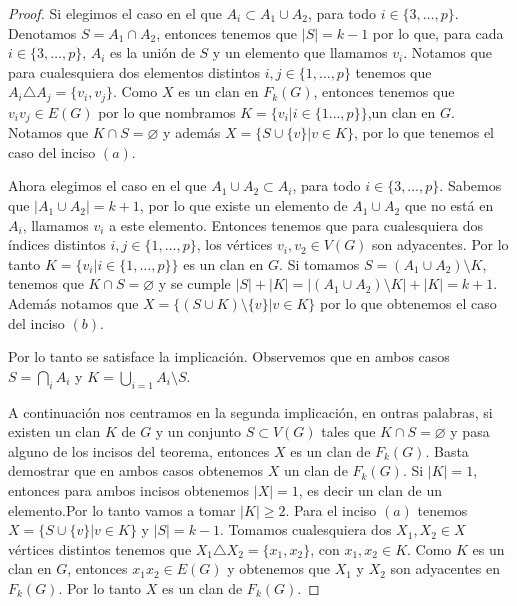 \begin{proof}
        Si elegimos el caso en el que $A_i \subset A_1\cup A_2$, para todo $i\in
        \{3, \dots, p\}$. Denotamos $S= A_1 \cap A_2$, entonces tenemos que $|S|
        =k-1$ por lo que, para cada $i \in \{3, \dots, p\}$, $A_i$ es la uni\'on
        de $S$ y un elemento que llamamos $v_i$. Notamos que para cualesquiera
        dos elementos distintos $i, j \in \{1, \dots, p\}$ tenemos que $A_i
        \triangle A_j = \{v_i, v_j\}$. Como $X$ es un clan en $F_k(G)$, entonces
        tenemos que $v_iv_j \in E(G)$ por lo que nombramos $K= \{v_i|i \in \{1
        \dots, p\}\}$,un clan en $G$. Notamos que  $K \cap S = \varnothing$ y
        adem\'as $X= \{S \cup \{v\}| v \in K\}$, por lo que tenemos el caso del
        inciso $(a)$. 

        Ahora elegimos el caso en el que $A_1\cup A_2 \subset A_i$, para todo
        $i\in \{3, \dots, p\}$. Sabemos que $|A_1 \cup A_2| = k+1$, por lo que
        existe un elemento de $A_1 \cup A_2$ que no est\'a en $A_i$, llamamos
        $v_i$ a este elemento. Entonces tenemos que para cualesquiera dos
        \'indices distintos $i, j \in \{1, \dots, p\}$, los v\'ertices $v_i, v_2
        \in V(G)$ son adyacentes. Por lo tanto $K= \{v_i| i \in \{1, \dots,
        p\}\}$ es un clan en $G$. Si tomamos $S= (A_1 \cup A_2)\setminus K$,
        tenemos que $K \cap S = \varnothing$ y se cumple $|S| + |K|= |(A_1 \cup
        A_2)\setminus K| + |K| = k+1$. Adem\'as notamos que $X = \{(S \cup
        K)\setminus \{v\}|v\in K\}$ por lo que obtenemos el caso del inciso
        $(b)$.

        Por lo tanto se satisface la implicaci\'on. Observemos que en ambos
        casos $S = \bigcap\limits_{i} A_i$ y $K = \bigcup\limits_{i=1} A_i
        \setminus S$.
        
        A continuaci\'on nos centramos en la segunda implicaci\'on, en ontras
        palabras, si existen un clan $K$ de $G$ y un conjunto $S \subset V(G)$
        tales que $K \cap S = \varnothing$ y pasa alguno de los incisos del
        teorema, entonces $X$ es un clan de $F_k(G)$. Basta demostrar que en
        ambos casos obtenemos $X$ un clan de $F_k(G)$. Si $|K| =1$, entonces
        para ambos incisos obtenemos $|X| =1$, es decir un clan de un
        elemento.Por lo tanto vamos a tomar $|K| \geq 2$. Para el inciso $(a)$
        tenemos $X = \{S \cup \{v\}| v \in K\}$ y $|S| = k-1$. Tomamos
        cualesquiera dos $X_1, X_2 \in X$ v\'ertices distintos tenemos que $X_1
        \triangle X_2 =\{x_1, x_2\}$, con $x_1, x_2 \in K$. Como $K$ es un clan
        en $G$, entonces $x_1x_2 \in E(G)$ y obtenemos que $X_1$ y $X_2$ son
        adyacentes en $F_k(G)$. Por lo tanto $X$ es un clan de $F_k(G)$.


\end{proof}
